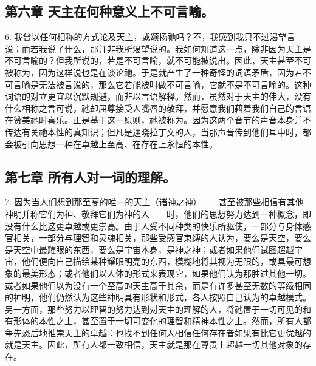 
\subsection{第六章  天主在何种意义上不可言喻。}

6. 我曾以任何相称的方式论及天主，或颂扬祂吗？不，我感到我只不过渴望言说；而若我说了什么，那并非我所渴望说的。我如何知道这一点，除非因为天主是不可言喻的？但我所说的，若是不可言喻，就不可能被说出。因此，天主甚至不可被称为，因为这样说也是在谈论祂。于是就产生了一种奇怪的词语矛盾，因为若不可言喻是无法被言说的，那么它若能被叫做不可言喻，它就不是不可言喻的。这种词语的对立更宜以沉默规避，而非以言语解释。然而，虽然对于天主的伟大，没有什么相称之言可说，祂却屈尊接受人嘴唇的敬拜，并愿意我们藉着我们自己的言语在赞美祂时喜乐。正是基于这一原则，祂被称为。因为这两个音节的声音本身并不传达有关祂本性的真知识；但凡是通晓拉丁文的人，当那声音传到他们耳中时，都会被引向思想一种在卓越上至高、在存在上永恒的本性。\par


\subsection{第七章  所有人对一词的理解。}

7. 因为当人们想到那至高的唯一的天主（诸神之神）——甚至被那些相信有其他神明并称它们为神、敬拜它们为神的人——时，他们的思想努力达到一种概念，即没有什么比这更卓越或更崇高。由于人受不同种类的快乐所驱使，一部分与身体感官相关，一部分与理智和灵魂相关，那些受感官束缚的人认为，要么是天空，要么是天空中最耀眼的东西，要么是宇宙本身，是神之神；或者如果他们试图超越宇宙，他们便向自己描绘某种耀眼明亮的东西，模糊地将其视为无限的，或具最可想象的最美形态；或者他们以人体的形式来表现它，如果他们认为那胜过其他一切。或者如果他们以为没有一个至高的天主高于其余，而是有许多甚至无数的等级相同的神明，他们仍然认为这些神明具有形状和形式，各人按照自己认为的卓越模式。另一方面，那些努力以理智的努力达到对天主的理解的人，将祂置于一切可见的和有形体的本性之上，甚至置于一切可变化的理智和精神本性之上。然而，所有人都争先恐后地推崇天主的卓越：也找不到任何人相信任何存在者如果有比它更优越的就是天主。因此，所有人都一致相信，天主就是那在尊贵上超越一切其他对象的存在。\par


